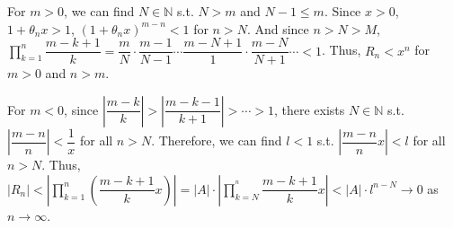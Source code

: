 \documentclass[12pt]{article}
\begin{document}
\begin{enumerate}
    For $m > 0$, we can find $N\in \mathbb{N}$ s.t. $N > m$ and $N-1 \leq m$.
    Since $x > 0$, $1 + \theta_n x > 1$, $(1+\theta_n x)^{m-n} < 1$ for $n > N$.
    And since $n > N > M$, $\displaystyle\prod_{k=1}^{n}\dfrac{m-k+1}{k} = \dfrac{m}{N} \cdot \dfrac{m-1}{N-1} \cdots \dfrac{m-N+1}{1} \cdot \dfrac{m-N}{N+1}\cdots < 1$.
    Thus, $R_n < x^n$ for $m > 0$ and $n > m$.
    
    For $m < 0$, since $|\dfrac{m-k}{k}| > |\dfrac{m-k-1}{k+1}| > \cdots > 1$,
    there exists $N\in \mathbb{N}$ s.t. $|\dfrac{m-n}{n}| < \dfrac{1}{x}$ for all $n > N$.
    Therefore, we can find $l < 1$ s.t. $|\dfrac{m-n}{n}x| < l$ for all $n > N$.
    Thus, $|R_n| < |\displaystyle\prod_{k=1}^{n} (\dfrac{m-k+1}{k}x)| = |A|\cdot |\displaystyle\prod_{k=N}^{^n} \dfrac{m-k+1}{k}x| < |A|\cdot l^{n-N} \to 0$ as $n\to\infty$.
\end{enumerate}
\end{document}
